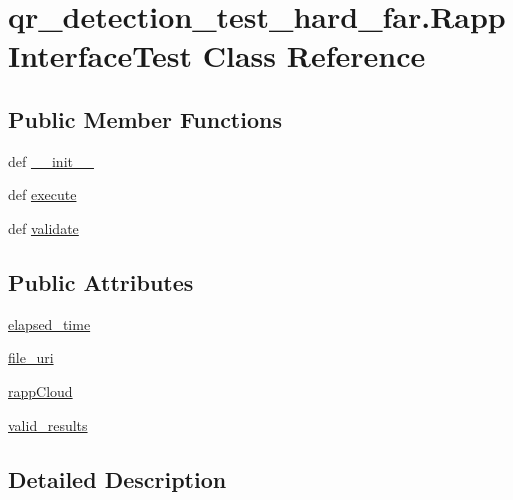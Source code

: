 \hypertarget{classqr__detection__test__hard__far_1_1RappInterfaceTest}{\section{qr\-\_\-detection\-\_\-test\-\_\-hard\-\_\-far.\-Rapp\-Interface\-Test Class Reference}
\label{classqr__detection__test__hard__far_1_1RappInterfaceTest}
}
\subsection*{Public Member Functions}
\begin{DoxyCompactItemize}
\item 
def \hyperlink{classqr__detection__test__hard__far_1_1RappInterfaceTest_afbf6c99bb431cd6f2e1e544010ad1987}{\-\_\-\-\_\-init\-\_\-\-\_\-}
\item 
def \hyperlink{classqr__detection__test__hard__far_1_1RappInterfaceTest_ab88c932d244284701a14b0aeb4cea0cf}{execute}
\item 
def \hyperlink{classqr__detection__test__hard__far_1_1RappInterfaceTest_ad15793fc354a8d5b766967e0554ef5f3}{validate}
\end{DoxyCompactItemize}
\subsection*{Public Attributes}
\begin{DoxyCompactItemize}
\item 
\hyperlink{classqr__detection__test__hard__far_1_1RappInterfaceTest_aa412f24e41f5bd5624e2d277bf5cb05a}{elapsed\-\_\-time}
\item 
\hyperlink{classqr__detection__test__hard__far_1_1RappInterfaceTest_ae023124d2f8adc94c2fdafeead46e00d}{file\-\_\-uri}
\item 
\hyperlink{classqr__detection__test__hard__far_1_1RappInterfaceTest_afd5a27e307863abd2b28208fd04252aa}{rapp\-Cloud}
\item 
\hyperlink{classqr__detection__test__hard__far_1_1RappInterfaceTest_a44db7218c1139d16a3eaeb95e43f89c1}{valid\-\_\-results}
\end{DoxyCompactItemize}


\subsection{Detailed Description}


